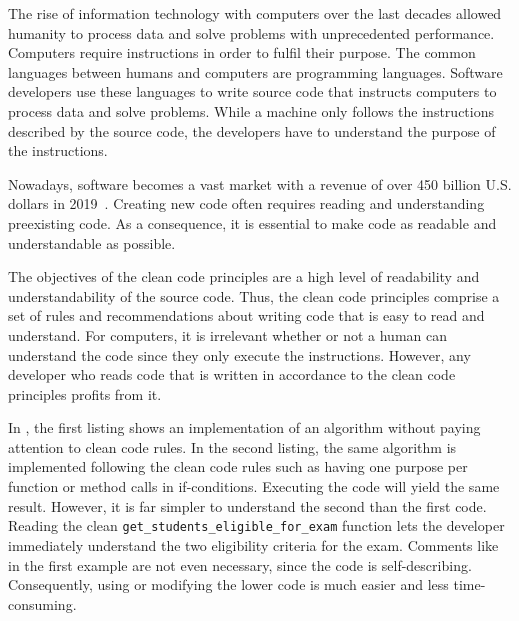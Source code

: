 The rise of information technology with computers over the last decades allowed humanity to process data and solve problems with unprecedented performance. Computers require instructions in order to fulfil their purpose. The common languages between humans and computers are programming languages. Software developers use these languages to write source code that instructs computers to process data and solve problems. While a machine only follows the instructions described by the source code, the developers have to understand the purpose of the instructions. 

Nowadays, software becomes a vast market with a revenue of over 450 billion U.S. dollars in 2019~\cite{statista_software_nodate,costello_gartner_2019}. Creating new code often requires reading and understanding preexisting code. As a consequence, it is essential to make code as readable and understandable as possible. 

The objectives of the clean code principles are a high level of readability and understandability of the source code. Thus, the clean code principles comprise a set of rules and recommendations about writing code that is easy to read and understand. For computers, it is irrelevant whether or not a human can understand the code since they only execute the instructions. However, any developer who reads code that is written in accordance to the clean code principles profits from it. 

In , the first listing shows an implementation of an algorithm without paying attention to clean code rules. In the second listing, the same algorithm is implemented following the clean code rules such as having one purpose per function or method calls in if-conditions. Executing the code will yield the same result. However, it is far simpler to understand the second than the first code. Reading the clean \texttt{get\_students\_eligible\_for\_exam} function lets the developer immediately understand the two eligibility criteria for the exam. Comments like in the first example are not even necessary, since the code is self-describing.
Consequently, using or modifying the lower code is much easier and less time-consuming.

